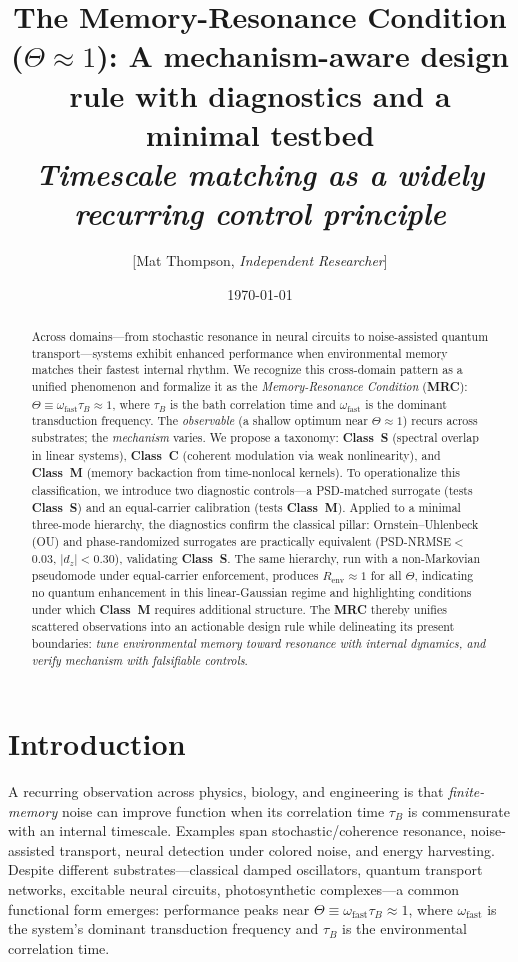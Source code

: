 \documentclass[11pt,letterpaper]{article}
\title{\bfseries\Large
The Memory-Resonance Condition ($\Theta\!\approx\!1$): A mechanism-aware design rule with diagnostics and a minimal testbed\\[0.35em]
\itshape\normalsize
Timescale matching as a widely recurring control principle}
\author{[Mat Thompson, \emph{Independent Researcher}]}
\date{\today}
\DeclareRobustCommand{\mrc}{\textbf{MRC}\xspace}
\DeclareRobustCommand{\classS}{\textbf{Class~S}\xspace}
\DeclareRobustCommand{\classC}{\textbf{Class~C}\xspace}
\DeclareRobustCommand{\classM}{\textbf{Class~M}\xspace}
\begin{document}
\maketitle

\begin{abstract}
Across domains---from stochastic resonance in neural circuits to noise-assisted quantum transport---systems exhibit enhanced performance when environmental memory matches their fastest internal rhythm. We recognize this cross-domain pattern as a unified phenomenon and formalize it as the \emph{Memory-Resonance Condition} (\mrc): $\Theta \equiv \omega_{\mathrm{fast}}\tau_B \approx 1$, where $\tau_B$ is the bath correlation time and $\omega_{\mathrm{fast}}$ is the dominant transduction frequency. The \emph{observable} (a shallow optimum near $\Theta\!\approx\!1$) recurs across substrates; the \emph{mechanism} varies. We propose a taxonomy: \classS{} (spectral overlap in linear systems), \classC{} (coherent modulation via weak nonlinearity), and \classM{} (memory backaction from time-nonlocal kernels). To operationalize this classification, we introduce two diagnostic controls---a PSD-matched surrogate (tests \classS) and an equal-carrier calibration (tests \classM). Applied to a minimal three-mode hierarchy, the diagnostics confirm the classical pillar: Ornstein--Uhlenbeck (OU) and phase-randomized surrogates are practically equivalent (PSD-NRMSE$<$0.03, $|d_z|<$0.30), validating \classS. The same hierarchy, run with a non-Markovian pseudomode under equal-carrier enforcement, produces $R_{\mathrm{env}}\approx 1$ for all $\Theta$, indicating no quantum enhancement in this linear-Gaussian regime and highlighting conditions under which \classM{} requires additional structure. The \mrc thereby unifies scattered observations into an actionable design rule while delineating its present boundaries: \emph{tune environmental memory toward resonance with internal dynamics, and verify mechanism with falsifiable controls}.
\end{abstract}

\section{Introduction}
A recurring observation across physics, biology, and engineering is that \emph{finite-memory} noise can improve function when its correlation time $\tau_B$ is commensurate with an internal timescale. Examples span stochastic/coherence resonance, noise-assisted transport, neural detection under colored noise, and energy harvesting. Despite different substrates---classical damped oscillators, quantum transport networks, excitable neural circuits, photosynthetic complexes---a common functional form emerges: performance peaks near $\Theta\equiv\omega_{\mathrm{fast}}\tau_B\approx 1$, where $\omega_{\mathrm{fast}}$ is the system's dominant transduction frequency and $\tau_B$ is the environmental correlation time.
\end{document}
